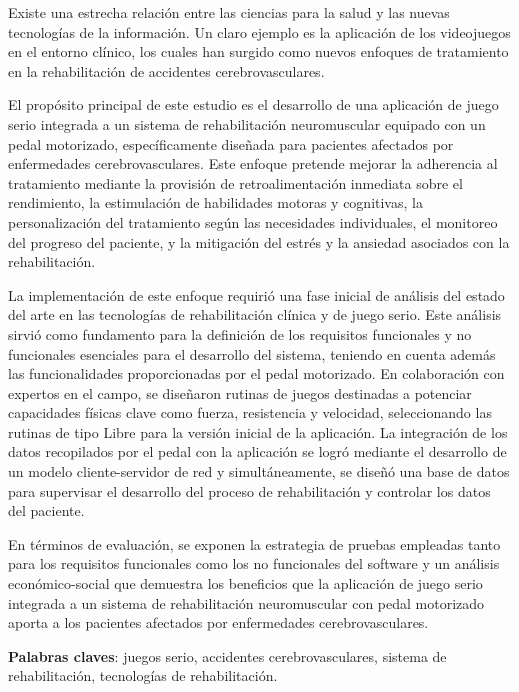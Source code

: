 \begin{resumen}
Existe una estrecha relación entre las ciencias para la salud y las nuevas tecnologías de la información. Un claro ejemplo es la aplicación de los videojuegos en el entorno clínico, los cuales han surgido como nuevos enfoques de tratamiento en la rehabilitación de accidentes cerebrovasculares. 

El propósito principal de este estudio es el desarrollo de una aplicación de juego serio integrada a un sistema de rehabilitación neuromuscular equipado con un pedal motorizado, específicamente diseñada para pacientes afectados por enfermedades cerebrovasculares. Este enfoque pretende mejorar la adherencia al tratamiento mediante la provisión de retroalimentación inmediata sobre el rendimiento, la estimulación de habilidades motoras y cognitivas, la personalización del tratamiento según las necesidades individuales, el monitoreo del progreso del paciente, y la mitigación del estrés y la ansiedad asociados con la rehabilitación.

La implementación de este enfoque requirió una fase inicial de análisis del estado del arte en las tecnologías de rehabilitación clínica y de juego serio. Este análisis sirvió como fundamento para la definición de los requisitos funcionales y no funcionales esenciales para el desarrollo del sistema, teniendo en cuenta además las funcionalidades proporcionadas por el pedal motorizado. En colaboración con expertos en el campo, se diseñaron rutinas de juegos destinadas a potenciar capacidades físicas clave como fuerza, resistencia y velocidad, seleccionando las rutinas de tipo Libre para la versión inicial de la aplicación. La integración de los datos recopilados por el pedal con la aplicación se logró mediante el desarrollo de un modelo cliente-servidor de red y simultáneamente, se diseñó una base de datos para supervisar el desarrollo del proceso de rehabilitación y controlar los datos del paciente.

En términos de evaluación, se exponen la estrategia de pruebas empleadas tanto para los requisitos funcionales como los no funcionales del software y un análisis económico-social que demuestra los beneficios que la aplicación de juego serio integrada a un sistema de rehabilitación neuromuscular con pedal motorizado aporta a los pacientes afectados por enfermedades cerebrovasculares.

\textbf{Palabras claves}: juegos serio, accidentes cerebrovasculares, sistema de rehabilitación, tecnologías de rehabilitación.
\end{resumen}
